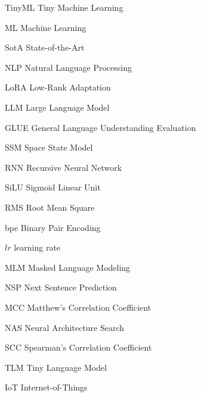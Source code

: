 



            {TinyML}
            {Tiny Machine Learning}

            {ML}
            {Machine Learning}

            {SotA}
            {State-of-the-Art}

            {NLP}
            {Natural Language Processing}

            {LoRA}
            {Low-Rank Adaptation}

            {LLM}
            {Large Language Model}

            {GLUE}
            {General Language Understanding Evaluation}

            {SSM}
            {Space State Model}

            {RNN}
            {Recursive Neural Network}

            {SiLU}
            {Sigmoid Linear Unit}

            {RMS}
            {Root Mean Square}

            {bpe}
            {Binary Pair Encoding}

            {\(lr\)}
            {learning rate}

            {MLM}
            {Masked Language Modeling}
            
            {NSP}
            {Next Sentence Prediction}

            {MCC}
            {Matthew's Correlation Coefficient}

            {NAS}
            {Neural Architecture Search}

            {SCC}
            {Spearman's Correlation Coefficient}

            {TLM}
            {Tiny Language Model}

            {IoT}
            {Internet-of-Things}
